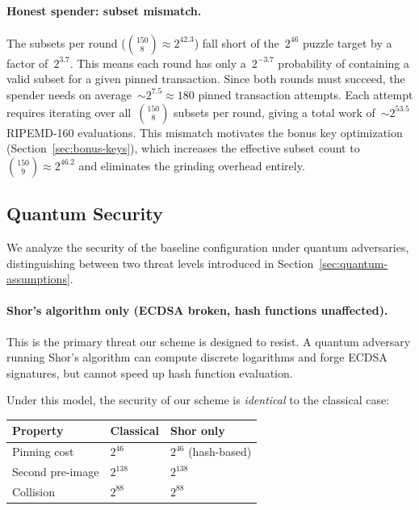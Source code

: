 \documentclass[11pt, a4paper]{article}
\begin{document}
\paragraph{Honest spender: subset mismatch.}
The subsets per round ($\binom{150}{8} \approx 2^{42.3}$) fall short of the~$2^{46}$ puzzle target by a factor of~$2^{3.7}$. This means each round has only a~$2^{-3.7}$ probability of containing a valid subset for a given pinned transaction. Since both rounds must succeed, the spender needs on average~${\sim}2^{7.5} \approx 180$ pinned transaction attempts. Each attempt requires iterating over all~$\binom{150}{8}$ subsets per round, giving a total work of~${\sim}2^{53.5}$ RIPEMD-160 evaluations. This mismatch motivates the bonus key optimization (Section~\ref{sec:bonus-keys}), which increases the effective subset count to~$\binom{150}{9} \approx 2^{46.2}$ and eliminates the grinding overhead entirely.

\subsection{Quantum Security}
\label{sec:quantum-security}

We analyze the security of the baseline configuration under quantum adversaries, distinguishing between two threat levels introduced in Section~\ref{sec:quantum-assumptions}.

\paragraph{Shor's algorithm only (ECDSA broken, hash functions unaffected).}
This is the primary threat our scheme is designed to resist. A quantum adversary running Shor's algorithm can compute discrete logarithms and forge ECDSA signatures, but cannot speed up hash function evaluation.

Under this model, the security of our scheme is \emph{identical} to the classical case:

\begin{center}
\begin{tabular}{lll}
\toprule
\textbf{Property} & \textbf{Classical} & \textbf{Shor only} \\
\midrule
Pinning cost & $2^{46}$ & $2^{46}$ (hash-based) \\
Second pre-image & $2^{138}$ & $2^{138}$ \\
Collision & $2^{88}$ & $2^{88}$ \\
\bottomrule
\end{tabular}
\end{center}
\end{document}
